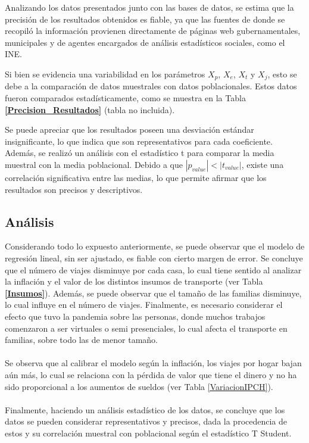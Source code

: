 \documentclass[12pt]{article} %
\begin{document}
Analizando los datos presentados junto con las bases de datos, se estima que la precisión de los resultados obtenidos es fiable, ya que las fuentes de donde se recopiló la información provienen directamente de páginas web gubernamentales, municipales y de agentes encargados de análisis estadísticos sociales, como el INE.

Si bien se evidencia una variabilidad en los parámetros $X_p$, $X_e$, $X_t$ y $X_j$, esto se debe a la comparación de datos muestrales con datos poblacionales. Estos datos fueron comparados estadísticamente, como se muestra en la Tabla \textbf{\ref{Precision_Resultados}} (tabla no incluida).

Se puede apreciar que los resultados poseen una desviación estándar insignificante, lo que indica que son representativos para cada coeficiente. Además, se realizó un análisis con el estadístico t para comparar la media muestral con la media poblacional. Debido a que \(|p_{value}| < |t_{value}|\), existe una correlación significativa entre las medias, lo que permite afirmar que los resultados son precisos y descriptivos.

\subsection{Análisis}

Considerando todo lo expuesto anteriormente, se puede observar que el modelo de regresión lineal, sin ser ajustado, es fiable con cierto margen de error. Se concluye que el número de viajes disminuye por cada casa, lo cual tiene sentido al analizar la inflación y el valor de los distintos insumos de transporte (ver Tabla \textbf{\ref{Insumos}}). Además, se puede observar que el tamaño de las familias disminuye, lo cual influye en el número de viajes. Finalmente, es necesario considerar el efecto que tuvo la pandemia sobre las personas, donde muchos trabajos comenzaron a ser virtuales o semi presenciales, lo cual afecta el transporte en familias, sobre todo las de menor tamaño.
\\ \\
Se observa que al calibrar el modelo según la inflación, los viajes por hogar bajan aún más, lo cual se relaciona con la pérdida de valor que tiene el dinero y no ha sido proporcional a los aumentos de sueldos (ver Tabla \ref{VariacionIPCH}).
\\ \\
Finalmente, haciendo un análisis estadístico de los datos, se concluye que los datos se pueden considerar representativos y precisos, dada la procedencia de estos y su correlación muestral con poblacional según el estadístico T Student.
\end{document}
